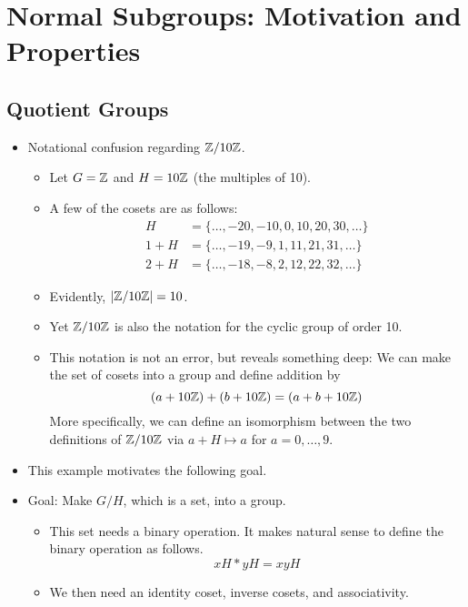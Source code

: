 \documentclass[../notes.tex]{subfiles}
\begin{document}
\chapter{Normal Subgroups: Motivation and Properties}
\section{Quotient Groups}
\begin{itemize}
    \item {}Notational confusion regarding $\mathbb{Z}/10\mathbb{Z}$.
    \begin{itemize}
        \item Let $G=\mathbb{Z}$ and $H=10\mathbb{Z}$ (the multiples of 10).
        \item A few of the cosets are as follows:
        \begin{align*}
            H &= \{\dots,-20,-10,0,10,20,30,\dots\}\\
            1+H &= \{\dots,-19,-9,1,11,21,31,\dots\}\\
            2+H &= \{\dots,-18,-8,2,12,22,32,\dots\}
        \end{align*}
        \item Evidently, $|\mathbb{Z}/10\mathbb{Z}|=10$.
        \item Yet $\mathbb{Z}/10\mathbb{Z}$ is also the notation for the cyclic group of order 10.
        \item This notation is not an error, but reveals something deep: We can make the set of cosets into a group and define addition by
        \begin{equation*}
            (a+10\mathbb{Z})+(b+10\mathbb{Z}) = (a+b+10\mathbb{Z})
        \end{equation*}
        More specifically, we can define an isomorphism between the two definitions of $\mathbb{Z}/10\mathbb{Z}$ via $a+H\mapsto a$ for $a=0,\dots,9$.
    \end{itemize}
    \item This example motivates the following goal.
    \item Goal: Make $G/H$, which is a set, into a group.
    \begin{itemize}
        \item This set needs a binary operation. It makes natural sense to define the binary operation as follows.
        \begin{equation*}
            xH*yH = xyH
        \end{equation*}
        \item We then need an identity coset, inverse cosets, and associativity.

\end{itemize}
\end{itemize}
\end{document}

